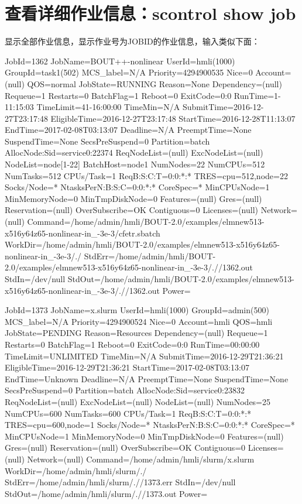 \section{查看详细作业信息：scontrol show job}
显示全部作业信息，显示作业号为JOBID的作业信息，输入类似下面：
\begin{OUT}
JobId=1362 JobName=BOUT++-nonlinear
   UserId=hmli(1000) GroupId=task1(502) MCS_label=N/A
   Priority=4294900535 Nice=0 Account=(null) QOS=normal
   JobState=RUNNING Reason=None Dependency=(null)
   Requeue=1 Restarts=0 BatchFlag=1 Reboot=0 ExitCode=0:0
   RunTime=1-11:15:03 TimeLimit=41-16:00:00 TimeMin=N/A
   SubmitTime=2016-12-27T23:17:48 EligibleTime=2016-12-27T23:17:48
   StartTime=2016-12-28T11:13:07 EndTime=2017-02-08T03:13:07 Deadline=N/A
   PreemptTime=None SuspendTime=None SecsPreSuspend=0
   Partition=batch AllocNode:Sid=service0:22374
   ReqNodeList=(null) ExcNodeList=(null)
   NodeList=node[1-22]
   BatchHost=node1
   NumNodes=22 NumCPUs=512 NumTasks=512 CPUs/Task=1 ReqB:S:C:T=0:0:*:*
   TRES=cpu=512,node=22
   Socks/Node=* NtasksPerN:B:S:C=0:0:*:* CoreSpec=*
   MinCPUsNode=1 MinMemoryNode=0 MinTmpDiskNode=0
   Features=(null) Gres=(null) Reservation=(null)
   OverSubscribe=OK Contiguous=0 Licenses=(null) Network=(null)
   Command=/home/admin/hmli/BOUT-2.0/examples/elmnew513-x516y64z65-nonlinear-in_-3e-3/cfetr.sbatch
   WorkDir=/home/admin/hmli/BOUT-2.0/examples/elmnew513-x516y64z65-nonlinear-in_-3e-3/./
   StdErr=/home/admin/hmli/BOUT-2.0/examples/elmnew513-x516y64z65-nonlinear-in_-3e-3/.//1362.out
   StdIn=/dev/null
   StdOut=/home/admin/hmli/BOUT-2.0/examples/elmnew513-x516y64z65-nonlinear-in_-3e-3/.//1362.out
   Power=

JobId=1373 JobName=x.slurm
   UserId=hmli(1000) GroupId=admin(500) MCS_label=N/A
   Priority=4294900524 Nice=0 Account=hmli QOS=hmli
   JobState=PENDING Reason=Resources Dependency=(null)
   Requeue=1 Restarts=0 BatchFlag=1 Reboot=0 ExitCode=0:0
   RunTime=00:00:00 TimeLimit=UNLIMITED TimeMin=N/A
   SubmitTime=2016-12-29T21:36:21 EligibleTime=2016-12-29T21:36:21
   StartTime=2017-02-08T03:13:07 EndTime=Unknown Deadline=N/A
   PreemptTime=None SuspendTime=None SecsPreSuspend=0
   Partition=batch AllocNode:Sid=service0:23832
   ReqNodeList=(null) ExcNodeList=(null)
   NodeList=(null)
   NumNodes=25 NumCPUs=600 NumTasks=600 CPUs/Task=1 ReqB:S:C:T=0:0:*:*
   TRES=cpu=600,node=1
   Socks/Node=* NtasksPerN:B:S:C=0:0:*:* CoreSpec=*
   MinCPUsNode=1 MinMemoryNode=0 MinTmpDiskNode=0
   Features=(null) Gres=(null) Reservation=(null)
   OverSubscribe=OK Contiguous=0 Licenses=(null) Network=(null)
   Command=/home/admin/hmli/slurm/x.slurm
   WorkDir=/home/admin/hmli/slurm/./
   StdErr=/home/admin/hmli/slurm/.//1373.err
   StdIn=/dev/null
   StdOut=/home/admin/hmli/slurm/.//1373.out
   Power=
\end{OUT}

